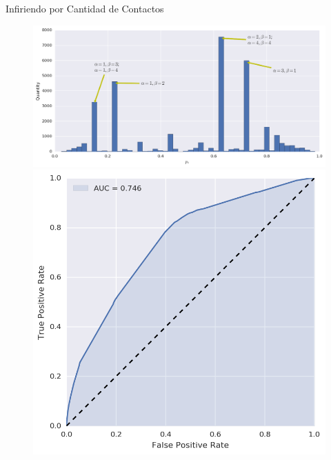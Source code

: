 \documentclass{beamer}
\begin{document}
\begin{frame}{Infiriendo por Cantidad de Contactos}

	\begin{figure}
		\includegraphics[width=\framewidth, height=.37\textheight, keepaspectratio]{figures/bayes/hist_contacts.png} \\
		\includegraphics[width=.49\framewidth, height=.37\textheight, keepaspectratio]{figures/bayes/roc_contacts.png}

\end{figure}
\end{frame}
\end{document}
